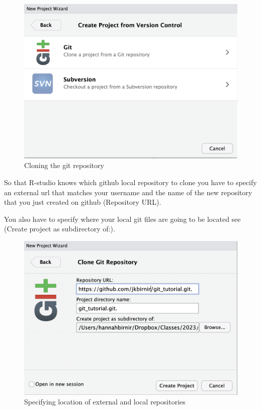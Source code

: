 \documentclass[
  letterpaper,
  DIV=11,
  numbers=noendperiod]{scrartcl}
\begin{document}
\begin{figure}

{\centering \includegraphics{figures/6.PNG}

}

\caption{Cloning the git repository}

\end{figure}

So that R-studio knows which github local repository to clone you have
to specify an external url that matches your username and the name of
the new repository that you just created on github (Repository URL).

You also have to specify where your local git files are going to be
located see (Create project as subdirectory of:).

\begin{figure}

{\centering \includegraphics{figures/7.PNG}

}

\caption{Specifying location of external and local repositories}

\end{figure}
\end{document}
